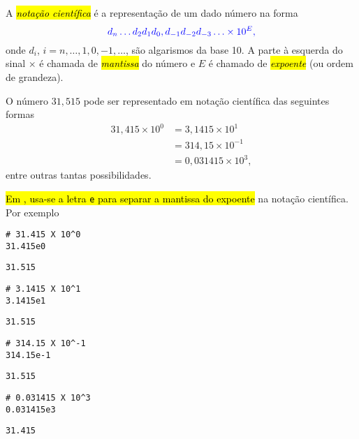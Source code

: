 A \hl{\emph{notação científica}} é a representação de um dado número na forma
\begin{equation}
  \color{blue}d_{n}\ldots d_2d_1d_0,d_{-1}d_{-2}d_{-3}\ldots \times 10^{E},
\end{equation}
onde $d_i$, $i=n, \ldots, 1, 0, -1, \ldots$, são algarismos da base 10. A parte à esquerda do sinal $\times$ é chamada de \hl{\emph{mantissa}} do número e $E$ é chamado de \hl{\emph{expoente}} (ou ordem de grandeza).

\begin{ex}\label{ex:notacao_cientifica}
  O número $31,515$ pode ser representado em notação científica das seguintes formas
  \begin{align}
    31,415\times 10^0 &= 3,1415\times 10^{1} \\
                      &= 314,15\times 10^{-1} \\
                      &= 0,031415\times 10^{3},
  \end{align}
  entre outras tantas possibilidades.

  \hl{Em {\python}, usa-se a letra \texttt{e} para separar a mantissa do expoente} na notação científica. Por exemplo

\begin{lstlisting}
# 31.415 X 10^0
31.415e0
\end{lstlisting}

\begin{verbatim}
31.515
\end{verbatim}

\begin{lstlisting}
# 3.1415 X 10^1
3.1415e1
\end{lstlisting}

\begin{verbatim}
31.515
\end{verbatim}

\begin{lstlisting}
# 314.15 X 10^-1
314.15e-1
\end{lstlisting}

\begin{verbatim}
31.515
\end{verbatim}

\begin{lstlisting}
# 0.031415 X 10^3
0.031415e3
\end{lstlisting}

\begin{verbatim}
31.415
\end{verbatim}

\end{ex}

